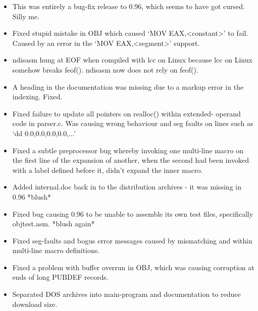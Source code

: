 \begin{itemize}
    \item{This was entirely a bug-fix release to 0.96, which seems to have got
        cursed. Silly me.}
    \item{Fixed stupid mistake in OBJ which caused `MOV EAX,<constant>' to
        fail. Caused by an error in the `MOV EAX,<segment>' support.}
    \item{ndisasm hung at EOF when compiled with lcc on Linux because lcc on
        Linux somehow breaks feof(). ndisasm now does not rely on feof().}
    \item{A heading in the documentation was missing due to a markup error in
        the indexing. Fixed.}
    \item{Fixed failure to update all pointers on realloc() within extended-
        operand code in parser.c. Was causing wrong behaviour and seg faults
        on lines such as `dd 0.0,0.0,0.0,0.0,...'}
    \item{Fixed a subtle preprocessor bug whereby invoking one multi-line
        macro on the first line of the expansion of another, when the second
        had been invoked with a label defined before it, didn't expand the
        inner macro.}
    \item{Added internal.doc back in to the distribution archives - it was
        missing in 0.96 *blush*}
    \item{Fixed bug causing 0.96 to be unable to assemble its own test files,
        specifically objtest.asm. *blush again*}
    \item{Fixed seg-faults and bogus error messages caused by mismatching
         and  within multi-line macro definitions.}
    \item{Fixed a problem with buffer overrun in OBJ, which was causing
        corruption at ends of long PUBDEF records.}
    \item{Separated DOS archives into main-program and documentation to reduce
        download size.}
\end{itemize}



